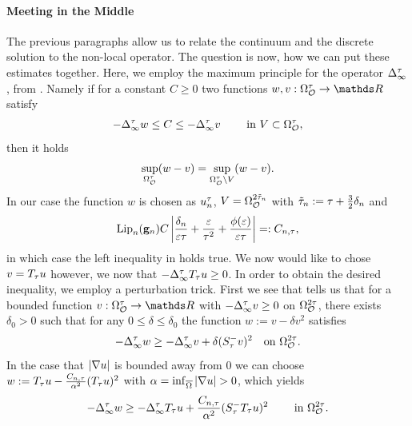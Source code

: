 \paragraph{Meeting in the Middle} The previous paragraphs allow us to relate the continuum and the discrete solution to the non-local operator. The question is now, how we can put these estimates together. Here, we employ the maximum principle for the operator $\Delta_\infty^\tau$, from \cite[Thm. 2.6.5]{smart2010infinity}. Namely if for a constant $C\geq 0$ two functions $w,v:\domain_\conset^\nlscale\to\R$ satisfy
\begin{align}\label{eq:maxprincnonl}
-\Delta_\infty^\tau w \leq C \leq -\Delta_\infty^\tau v\qquad\text{ in } V\subset \Omega_{\mathcal{O}}^\tau,
\end{align}
%
then it holds
%
\begin{align*}
\sup_{\Omega^\tau_{\mathcal{O}}}(w-v) = \sup_{\Omega^\tau_{\mathcal{O}}\setminus V}(w-v).
\end{align*}
%
In our case the function $w$ is chosen as $u^\tau_n$, $V=\Omega_{\mathcal{O}}^{2\tilde{\tau}_n}$ with $\tilde{\tau}_n:=\tau+\frac{3}{2}\delta_n$ and
%
\begin{align*}
\operatorname{Lip}_n(\mathbf{g}_n) C 
\left|
\frac{\delta_n}{\varepsilon\tau} + 
\frac{\varepsilon}{\tau^2} +
\frac{\phi(\varepsilon)}{\varepsilon\tau}
\right| =: C_{n,\tau},
\end{align*}
%
in which case the left inequality in  holds true. We now would like to chose $v = T_\tau u$ however, we now that $-\Delta^\tau_\infty T_\tau u\geq 0$. In order to obtain the desired inequality, we employ a perturbation trick. First we see that \cite[Lem. 2.6.4]{smart2010infinity} tells us that for a bounded function $v:\domain_\constr^\nlscale\to\R$ with $-\Delta_\infty^\tau v \geq 0$ on $\Omega_{\mathcal{O}}^{2\tau}$, there exists $\delta_0>0$ such that for any $0\leq\delta\leq\delta_0$ the function $w:=v-\delta v^2$ satisfies
\begin{align*}
-\Delta_\infty^\tau w \geq -\Delta_\infty^\tau v + \delta(S^-_\tau v)^2\quad\text{on }\Omega_{\mathcal{O}}^{2\tau}.
\end{align*}
%
%
In the case that $\left|\nabla u\right|$ is bounded away from $0$ we can choose $w:=T_\tau u-\frac{C_{n,\tau}}{\alpha^2}(T_\tau u)^2$ with $\alpha=\inf_{\closure\domain}\abs{\grad u}>0$, which yields 
%
\begin{align*}
-\Delta_\infty^\tau w \geq -\Delta_\infty^\tau T_\tau u + \frac{C_{n,\tau}}{\alpha^2} (S^-_\tau T_\tau u)^2\qquad\text{ in }\Omega_{\mathcal{O}}^{2\tau}.
\end{align*}
